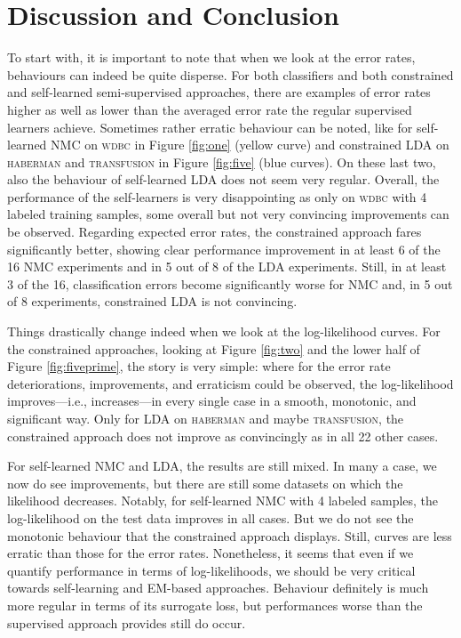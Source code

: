 \documentclass[twoside]{memoir}\usepackage[]{graphicx}\usepackage{xcolor}
\begin{document}
\section{Discussion and Conclusion}\label{sect:fin}

To start with, it is important to note that when we look at the error rates, behaviours can indeed be quite disperse.  For both classifiers and both constrained and self-learned semi-supervised approaches, there are examples of error rates higher as well as lower than the averaged error rate the regular supervised learners achieve.  Sometimes rather erratic behaviour can be noted, like for self-learned NMC on {\scshape wdbc} in Figure \ref{fig:one} (yellow curve) and constrained LDA on {\scshape haberman} and {\scshape transfusion} in Figure \ref{fig:five} (blue curves).  On these last two, also the behaviour of self-learned LDA does not seem very regular.  Overall, the performance of the self-learners is very disappointing as only on {\scshape wdbc} with 4 labeled training samples, some overall but not very convincing improvements can be observed.  Regarding expected error rates, the constrained approach fares significantly better, showing clear performance improvement in at least 6 of the 16 NMC experiments and in 5 out of 8 of the LDA experiments.  Still, in at least 3 of the 16, classification errors become significantly worse for NMC and, in 5 out of 8 experiments, constrained LDA is not convincing.

Things drastically change indeed when we look at the log-likelihood curves.  For the constrained approaches, looking at Figure \ref{fig:two} and the lower half of Figure \ref{fig:fiveprime}, the story is very simple: where for the error rate deteriorations, improvements, and erraticism could be observed, the log-likelihood improves---i.e., increases---in every single case in a smooth, monotonic, and significant way.  Only for LDA on {\scshape haberman} and maybe {\scshape transfusion}, the constrained approach does not improve as convincingly as in all 22 other cases.

For self-learned NMC and LDA, the results are still mixed.  In many a case, we now do see improvements, but there are still some datasets on which the likelihood decreases.  Notably, for self-learned NMC with 4 labeled samples, the log-likelihood on the test data improves in all cases.  But we do not see the monotonic behaviour that the constrained approach displays.  Still, curves are less erratic than those for the error rates.  Nonetheless, it seems that even if we quantify performance in terms of log-likelihoods, we should be very critical towards self-learning and EM-based approaches. Behaviour definitely is much more regular in terms of its surrogate loss, but performances worse than the supervised approach provides still do occur.
\end{document}
